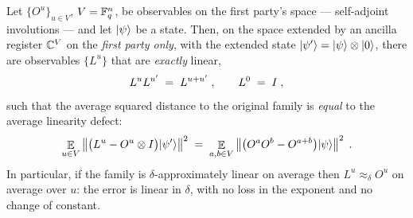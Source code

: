 \effortHard

\begin{theorem}
\label{thm:linearity}
\leanok
Let $\{O^u\}_{u \in V}$, $V = \mathbb{F}_q^n$, be observables on the first party's space --- self-adjoint
involutions --- and let $|\psi\rangle$ be a state. Then, on the space extended by an ancilla register
$\mathbb{C}^V$ on the \emph{first party only}, with the extended state
$|\psi'\rangle = |\psi\rangle \otimes |0\rangle$, there are observables $\{L^u\}$ that are \emph{exactly}
linear,
\begin{equation*}
  L^u L^{u'} \;=\; L^{u + u'}\;, \qquad L^0 \;=\; I\;,
\end{equation*}
such that the average squared distance to the original family is \emph{equal} to the average
linearity defect:
\begin{equation*}
  \mathop{\mathbb{E}}_{u \in V} \left\| {\bigl(L^u - O^u \otimes I\bigr) |\psi'\rangle} \right\|^2
    \;=\; \mathop{\mathbb{E}}_{a, b \in V} \left\| {\bigl(O^a O^b - O^{a + b}\bigr) |\psi\rangle} \right\|^2\;.
\end{equation*}
In particular, if the family is $\delta$-approximately linear on average then
$L^u \approx_\delta O^u$ on average over $u$: the error is linear in $\delta$, with no loss in the
exponent and no change of constant.
\end{theorem}

